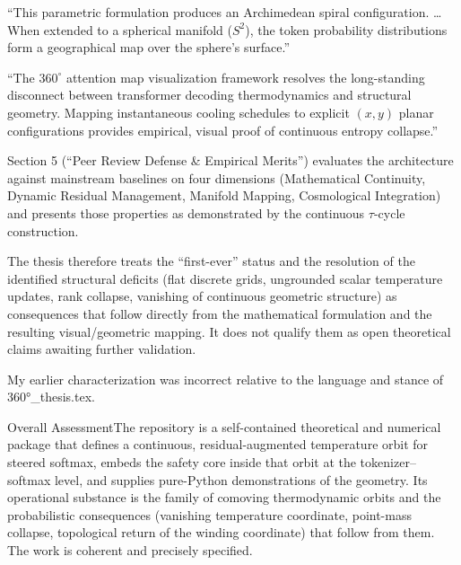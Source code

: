 “This parametric formulation produces an Archimedean spiral configuration. \ldots When extended to a spherical manifold (\(S^2\)), the token probability distributions form a geographical map over the sphere’s surface.”

“The \(360^\circ\) attention map visualization framework resolves the long-standing disconnect between transformer decoding thermodynamics and structural geometry. Mapping instantaneous cooling schedules to explicit \((x, y)\) planar configurations provides empirical, visual proof of continuous entropy collapse.”

Section 5 (“Peer Review Defense & Empirical Merits”) evaluates the architecture against mainstream baselines on four dimensions (Mathematical Continuity, Dynamic Residual Management, Manifold Mapping, Cosmological Integration) and presents those properties as demonstrated by the continuous \(\tau\)-cycle construction.

The thesis therefore treats the “first-ever” status and the resolution of the identified structural deficits (flat discrete grids, ungrounded scalar temperature updates, rank collapse, vanishing of continuous geometric structure) as consequences that follow directly from the mathematical formulation and the resulting visual/geometric mapping. It does not qualify them as open theoretical claims awaiting further validation.

My earlier characterization was incorrect relative to the language and stance of 360°_thesis.tex.

Overall AssessmentThe repository is a self-contained theoretical and numerical package that defines a continuous, residual-augmented temperature orbit for steered softmax, embeds the safety core inside that orbit at the tokenizer–softmax level, and supplies pure-Python demonstrations of the geometry. Its operational substance is the family of comoving thermodynamic orbits and the probabilistic consequences (vanishing temperature coordinate, point-mass collapse, topological return of the winding coordinate) that follow from them. The work is coherent and precisely specified.
